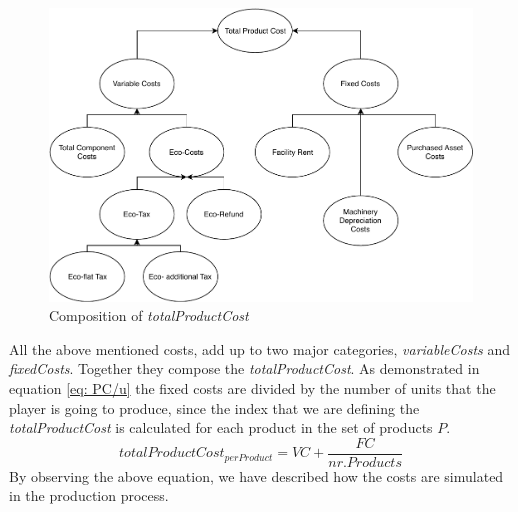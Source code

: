\begin{figure}[H]
	\centering
		\includegraphics[scale=0.55]{images/ProductionCosts.pdf}
	\caption{Composition of \textit{totalProductCost}}
	\label{fig:productionCosts}
\end{figure}
All the above mentioned costs, add up to two major categories, \textit{variableCosts} and \textit{fixedCosts}. Together they compose the \textit{totalProductCost}. As demonstrated in equation \ref{eq: PC/u} the fixed costs are divided by the number of units that the player is going to produce, since the index that we are defining the \textit{totalProductCost} is calculated for each product in the set of products $P$.
\begin{equation}
	totalProductCost_{per Product}= VC + \frac{FC}{nr.Products} %
	\label{eq: PC/u}
\end{equation}
By observing the above equation, we have described how the costs are simulated in the production process. 


